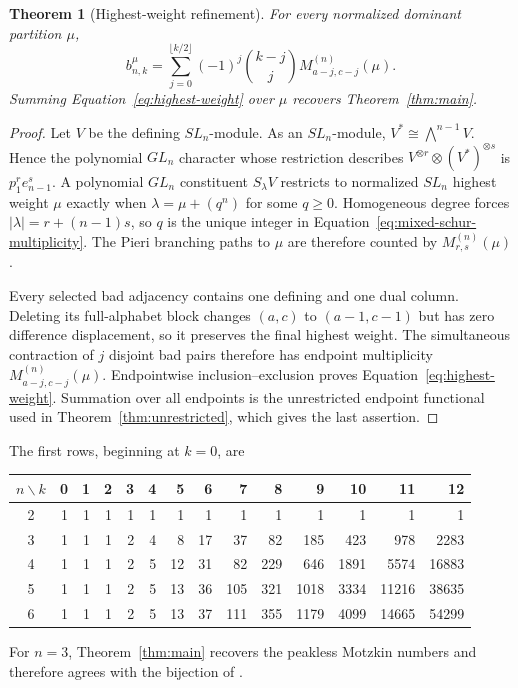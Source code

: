 \documentclass[11pt]{article}
\newtheorem{theorem}{Theorem}[section]
\theoremstyle{definition}
\begin{document}
\begin{theorem}[Highest-weight refinement]\label{thm:highest-weight}
For every normalized dominant partition $\mu$,
\begin{equation}\label{eq:highest-weight}
 \boxed{
 b_{n,k}^{\mu}=
 \sum_{j=0}^{\lfloor k/2\rfloor}(-1)^j\binom{k-j}{j}
 M_{a-j,c-j}^{(n)}(\mu).}
\end{equation}
Summing Equation~\eqref{eq:highest-weight} over $\mu$ recovers
Theorem~\ref{thm:main}.
\end{theorem}

\begin{proof}
Let $V$ be the defining $SL_n$-module.  As an $SL_n$-module,
$V^*\cong\bigwedge^{n-1}V$.  Hence the polynomial $GL_n$ character whose
restriction describes $V^{\otimes r}\otimes(V^*)^{\otimes s}$ is
$p_1^r e_{n-1}^s$.  A polynomial $GL_n$ constituent $S_\lambda V$ restricts
to normalized $SL_n$ highest weight $\mu$ exactly when
$\lambda=\mu+(q^n)$ for some $q\ge0$.  Homogeneous degree forces
$|\lambda|=r+(n-1)s$, so $q$ is the unique integer in
Equation~\eqref{eq:mixed-schur-multiplicity}.  The Pieri branching paths to
$\mu$ are therefore counted by $M_{r,s}^{(n)}(\mu)$.

Every selected bad adjacency contains one defining and one dual column.
Deleting its full-alphabet block changes $(a,c)$ to $(a-1,c-1)$ but has zero
difference displacement, so it preserves the final highest weight.  The
simultaneous contraction of $j$ disjoint bad pairs therefore has endpoint
multiplicity $M_{a-j,c-j}^{(n)}(\mu)$.  Endpointwise inclusion--exclusion
proves Equation~\eqref{eq:highest-weight}.  Summation over all endpoints is
the unrestricted endpoint functional used in Theorem~\ref{thm:unrestricted},
which gives the last assertion.
\end{proof}

The first rows, beginning at $k=0$, are
\begin{center}
\small
\begin{tabular}{c|rrrrrrrrrrrrr}
\toprule
$n\backslash k$&0&1&2&3&4&5&6&7&8&9&10&11&12\\
\midrule
2&1&1&1&1&1&1&1&1&1&1&1&1&1\\
3&1&1&1&2&4&8&17&37&82&185&423&978&2283\\
4&1&1&1&2&5&12&31&82&229&646&1891&5574&16883\\
5&1&1&1&2&5&13&36&105&321&1018&3334&11216&38635\\
6&1&1&1&2&5&13&37&111&355&1179&4099&14665&54299\\
\bottomrule
\end{tabular}
\end{center}
For $n=3$, Theorem~\ref{thm:main} recovers the peakless Motzkin numbers and
therefore agrees with the bijection of \cite{Tenn2026}.
\end{document}
